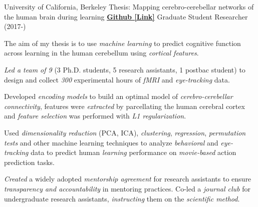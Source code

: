 

\begin{cventries}

  \cventry
    {University of California, Berkeley} %
    {Thesis: Mapping cerebro-cerebellar networks of the human brain during learning}
    {\href{https://github.com/maedbhk/cerebellum_learning_connect}{\textbf{Github [Link]}}}
    {Graduate Student Researcher (2017-)} %
    {
      \begin{cvitems} %
        \item {The aim of my thesis is to use \textit{machine learning} to predict cognitive function across learning in the human cerebellum using \textit{cortical features}.} 
        \item {\textit{Led a team of 9} (3 Ph.D. students, 5 research assistants, 1 postbac student) to design and collect \textit{300} experimental hours of \textit{fMRI} and \textit{eye-tracking} data.}
        \item {Developed \textit{encoding models} to build an optimal model of \textit{cerebro-cerebellar connectivity}, features were \textit{extracted} by parcellating the human cerebral cortex and \textit{feature selection} was performed with \textit{L1 regularization}.}
        \item {Used \textit{dimensionality reduction} (PCA, ICA), \textit{clustering}, \textit{regression}, \textit{permutation tests} and other machine learning techniques to analyze \textit{behavioral} and \textit{eye-tracking} data to predict human \textit{learning} performance on \textit{movie-based} action prediction tasks.}
        \item {\textit{Created} a widely adopted \textit{mentorship agreement} for research assistants to ensure \textit{transparency and accountability} in mentoring practices. Co-led a \textit{journal club} for undergraduate research assistants, \textit{instructing} them on the \textit{scientific method}.}
      \end{cvitems}
    }
    

\end{cventries}

